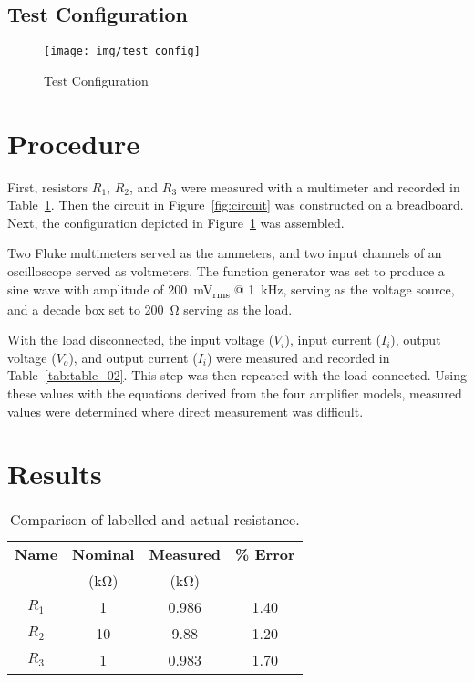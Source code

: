 \documentclass{article}
\begin{document}
\subsection*{Test Configuration}
\label{sec:test_config}

\begin{figure}[hbtp]
  \centering
  \texttt{[image: img/test\_config]}
  \caption{\label{fig:test_config} Test Configuration}
\end{figure}

\section{Procedure}
\label{sec:procedure}

First, resistors $R_1$, $R_2$, and $R_3$ were measured with a
multimeter and recorded in Table~\ref{tab:table_01}.  Then the circuit
in Figure~\ref{fig:circuit} was constructed on a breadboard.  Next,
the configuration depicted in Figure~\ref{fig:test_config} was assembled.

Two Fluke multimeters served as the ammeters, and two input channels
of an oscilloscope served as voltmeters.  The function generator was
set to produce a sine wave with amplitude of
\SI{200}{\milli\volt_{rms}} @ \SI{1}{\kilo\hertz}, serving as the
voltage source, and a decade box set to \SI{200}{\ohm} serving as the
load.

With the load disconnected, the input voltage ($V_i$), input current
($I_i$), output voltage ($V_o$), and output current ($I_i$) were
measured and recorded in Table~\ref{tab:table_02}.  This step was then
repeated with the load connected.  Using these values with the
equations derived from the four amplifier models, measured values were
determined where direct measurement was difficult.

\section{Results}
\label{sec:results}

\begin{table}[hbtp]
  \centering
  \begin{tabular}{*{4}{c}}
    \textbf{Name} & \textbf{Nominal} & \textbf{Measured} & \textbf{\% Error} \\
    & (\si{\kilo\ohm}) & (\si{\kilo\ohm}) & \\
    \hline
    $R_1$ & 1 & 0.986 & 1.40 \\
    $R_2$ & 10 & 9.88 & 1.20 \\
    $R_3$ & 1 & 0.983 & 1.70 \\
  \end{tabular}
  \caption{Comparison of labelled and actual resistance.}
  \label{tab:table_01}
  \end{table}
\end{document}
